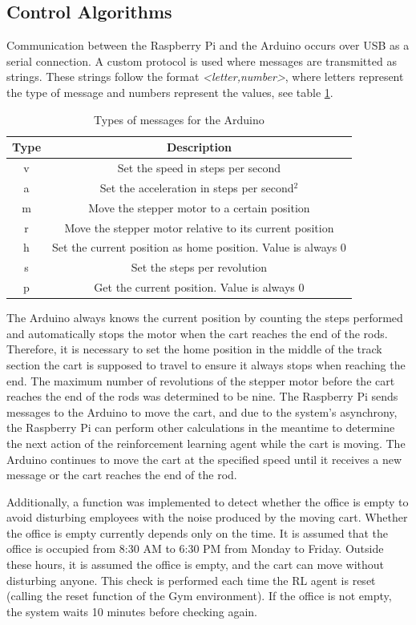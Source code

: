 \subsection{Control Algorithms}
Communication between the Raspberry Pi and the Arduino occurs over USB as a serial connection. A custom protocol is used where messages are transmitted as strings. These strings follow the format \textit{<letter,number>}, where letters represent the type of message and numbers represent the values, see table \ref{tab:types_of_messages}.
\begin{table}
    \caption{Types of messages for the Arduino}
    \label{tab:types_of_messages}
    \begin{tabular}{|c|c|}
        \hline
        Type & Description \\
        \hline
        v & Set the speed in steps per second \\
        a & Set the acceleration in steps per second$^2$ \\
        m & Move the stepper motor to a certain position \\
        r & Move the stepper motor relative to its current position \\
        h & Set the current position as home position. Value is always 0 \\
        s & Set the steps per revolution \\
        p & Get the current position. Value is always 0 \\
        \hline
    \end{tabular}
    \end{table}
The Arduino always knows the current position by counting the steps performed and automatically stops the motor when the cart reaches the end of the rods. Therefore, it is necessary to set the home position in the middle of the track section the cart is supposed to travel to ensure it always stops when reaching the end. The maximum number of revolutions of the stepper motor before the cart reaches the end of the rods was determined to be nine. The Raspberry Pi sends messages to the Arduino to move the cart, and due to the system's asynchrony, the Raspberry Pi can perform other calculations in the meantime to determine the next action of the reinforcement learning agent while the cart is moving. The Arduino continues to move the cart at the specified speed until it receives a new message or the cart reaches the end of the rod.

Additionally, a function was implemented to detect whether the office is empty to avoid disturbing employees with the noise produced by the moving cart. Whether the office is empty currently depends only on the time. It is assumed that the office is occupied from 8:30 AM to 6:30 PM from Monday to Friday. Outside these hours, it is assumed the office is empty, and the cart can move without disturbing anyone. This check is performed each time the RL agent is reset (calling the reset function of the Gym environment). If the office is not empty, the system waits 10 minutes before checking again.